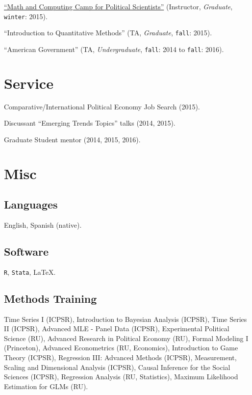\documentclass[letterpaper]{article}
\renewenvironment{itemize}{
  \begin{list}{}{
    \setlength{\leftmargin}{1.5em}
  }
}{
  \end{list}
}
\begin{document}
\begin{itemize}
\item \href{https://github.com/hbahamonde/Math-Camp/raw/master/Syllabus/Math_Camp_Syllabus.pdf/}{``Math and Computing Camp for Political Scientists''} (Instructor, \emph{Graduate}, \texttt{winter}: 2015).
\item ``Introduction to Quantitative Methods'' (TA, \emph{Graduate}, \texttt{fall}: 2015).
\item ``American Government'' (TA, \emph{Undergraduate}, \texttt{fall}: 2014 to \texttt{fall}: 2016).
\end{itemize}


\section*{Service}

\begin{itemize}
\item Comparative/International Political Economy Job Search (2015).
\item Discussant ``Emerging Trends Topics'' talks (2014, 2015).
\item Graduate Student mentor (2014, 2015, 2016).
\end{itemize}


\section*{Misc}

\subsection*{Languages}
English, Spanish (native).


\subsection*{Software}
\texttt{R}, \texttt{Stata}, \LaTeX.

\subsection*{Methods Training}
Time Series I (ICPSR), Introduction to Bayesian Analysis (ICPSR), Time Series II (ICPSR), Advanced MLE - Panel Data (ICPSR), Experimental Political Science (RU), Advanced Research in Political Economy (RU), Formal Modeling I (Princeton), Advanced Econometrics (RU, Economics), Introduction to Game Theory (ICPSR), Regression III: Advanced Methods (ICPSR), Measurement, Scaling and Dimensional Analysis (ICPSR), Causal Inference for the Social Sciences (ICPSR), Regression Analysis (RU, Statistics), Maximum Likelihood Estimation for GLMs (RU).




\bigskip
\end{document}
